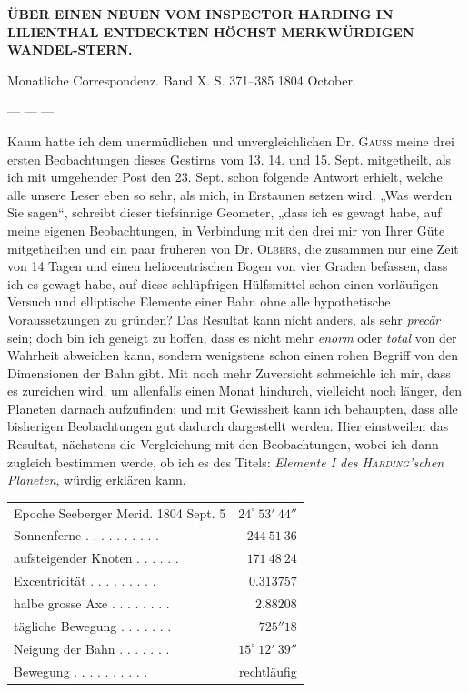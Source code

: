 \clearpage
{}
\hypertarget{native-255-lower}{}
\begin{center}
\textbf{ÜBER EINEN NEUEN VOM INSPECTOR HARDING IN LILIENTHAL ENTDECKTEN HÖCHST
MERKWÜRDIGEN WANDEL-STERN.}
\end{center}

\begin{center}
Monatliche Correspondenz. Band X. S. 371–385 1804 October.
\end{center}

\begin{center}
— — —
\end{center}

Kaum hatte ich dem unermüdlichen und unvergleichlichen Dr. \textsc{Gauss} meine drei ersten
Beobachtungen dieses Gestirns vom 13. 14. und 15. Sept. mitgetheilt, als ich mit
umgehender Post den 23. Sept. schon folgende Antwort erhielt, welche alle unsere Leser
eben so sehr, als mich, in Erstaunen setzen wird. „Was werden Sie sagen“, schreibt
dieser tiefsinnige Geometer, „dass ich es gewagt habe, auf meine eigenen Beobachtungen,
in Verbindung mit den drei mir von Ihrer Güte mitgetheilten und ein paar früheren
von Dr. \textsc{Olbers}, die zusammen nur eine Zeit von 14 Tagen und einen heliocentrischen
Bogen von vier Graden befassen, dass ich es gewagt habe, auf diese schlüpfrigen
Hülfsmittel schon einen vorläufigen Versuch und elliptische Elemente einer Bahn ohne
alle hypothetische Voraussetzungen zu gründen? Das Resultat kann nicht anders, als
sehr \textit{precär} sein; doch bin ich geneigt zu hoffen, dass es nicht mehr
\textit{enorm} oder \textit{total} von der Wahrheit abweichen kann, sondern wenigstens
schon einen rohen Begriff von den Dimensionen der Bahn gibt. Mit noch mehr Zuversicht
schmeichle ich mir, dass es zureichen wird, um allenfalls einen Monat hindurch,
vielleicht noch länger, den Planeten darnach aufzufinden; und mit Gewissheit kann ich
behaupten, dass alle bisherigen Beobachtungen gut dadurch dargestellt werden. Hier
einstweilen das Resultat, nächstens die Vergleichung mit den Beobachtungen, wobei ich
dann zugleich bestimmen werde, ob ich es des Titels: \textit{Elemente I des
\textsc{Harding}'schen Planeten}, würdig erklären kann.

\begin{center}
\begingroup\fontsize{9}{11}\selectfont\setlength{\tabcolsep}{3pt}
\begin{tabular}{lr}
Epoche Seeberger Merid. 1804 Sept. 5  & $24^\circ\ 53'\ 44''$ \\
Sonnenferne . . . . . . . . . . & $244\ 51\ 36$ \\
aufsteigender Knoten . . . . . . & $171\ 48\ 24$ \\
Excentricität . . . . . . . . . & $0.313757$ \\
halbe grosse Axe . . . . . . . . & $2.88208$ \\
tägliche Bewegung . . . . . . . & $725''18$ \\
Neigung der Bahn . . . . . . . & $15^\circ\ 12'\ 39''$ \\
Bewegung . . . . . . . . . . & rechtläufig \\
\end{tabular}\endgroup
\end{center}

